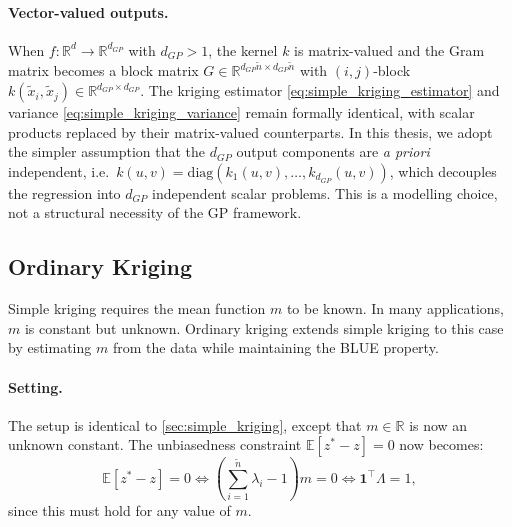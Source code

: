 \paragraph{Vector-valued outputs.} When $f : \mathbb{R}^d \to \mathbb{R}^{d_{GP}}$
with $d_{GP} > 1$, the kernel $k$ is matrix-valued and the Gram matrix becomes a
block matrix $G \in \mathbb{R}^{d_{GP}\tilde{n} \times d_{GP}\tilde{n}}$ with
$(i,j)$-block $k(\tilde{x}_i, \tilde{x}_j) \in \mathbb{R}^{d_{GP} \times d_{GP}}$.
The kriging estimator \eqref{eq:simple_kriging_estimator} and variance
\eqref{eq:simple_kriging_variance} remain formally identical, with scalar
products replaced by their matrix-valued counterparts. In this thesis, we
adopt the simpler assumption that the $d_{GP}$ output components are
\emph{a priori} independent, i.e.\ $k(u,v) = \mathrm{diag}(k_1(u,v), \ldots,
k_{d_{GP}}(u,v))$, which decouples the regression into $d_{GP}$ independent scalar
problems. This is a modelling choice, not a structural necessity of the GP
framework.

\subsection{Ordinary Kriging}
\label{sec:ordinary_kriging}

Simple kriging requires the mean function $m$ to be known. In many
applications, $m$ is constant but unknown. Ordinary kriging extends simple
kriging to this case by estimating $m$ from the data while maintaining the
BLUE property.

\paragraph{Setting.} The setup is identical to \cref{sec:simple_kriging},
except that $m \in \mathbb{R}$ is now an unknown constant. The unbiasedness
constraint $\mathbb{E}[z^* - z] = 0$ now becomes:
\begin{equation}
    \mathbb{E}[z^* - z] = 0
    \iff \left(\sum_{i=1}^{\tilde{n}} \lambda_i - 1\right) m = 0
    \iff \mathbf{1}^\top \Lambda = 1,
    \label{eq:OK_unbiasedness}
\end{equation}
since this must hold for any value of $m$.

